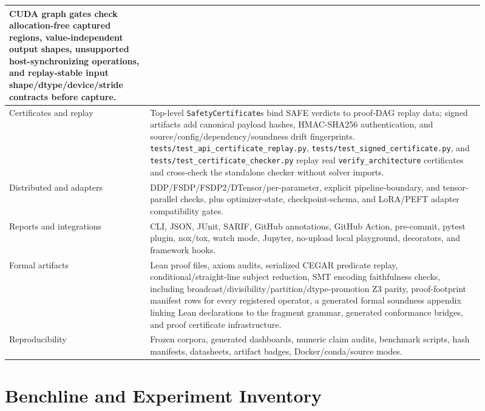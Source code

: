 \documentclass[11pt]{article}
\begin{document}
\begin{longtable}{|p{0.27\linewidth}|p{0.64\linewidth}|}
CUDA graph gates check allocation-free captured regions, value-independent
output shapes, unsupported host-synchronizing operations, and replay-stable
input shape/dtype/device/stride contracts before capture. \\
\hline
Certificates and replay &
Top-level \texttt{SafetyCertificate}s bind SAFE verdicts to proof-DAG replay
data; signed artifacts add canonical payload hashes, HMAC-SHA256 authentication,
and source/config/dependency/soundness drift fingerprints.
\texttt{tests/test\_api\_certificate\_replay.py},
\texttt{tests/test\_signed\_certificate.py}, and
\texttt{tests/test\_certificate\_checker.py} replay real
\texttt{verify\_architecture} certificates and cross-check the standalone
checker without solver imports. \\
\hline
Distributed and adapters &
DDP/FSDP/FSDP2/DTensor/per-parameter, explicit pipeline-boundary, and
tensor-parallel checks, plus
optimizer-state, checkpoint-schema, and LoRA/PEFT adapter compatibility gates. \\
\hline
Reports and integrations &
CLI, JSON, JUnit, SARIF, GitHub annotations, GitHub Action, pre-commit, pytest
plugin, nox/tox, watch mode, Jupyter, no-upload local playground, decorators,
and framework hooks. \\
\hline
Formal artifacts &
Lean proof files, axiom audits, serialized CEGAR predicate replay,
conditional/straight-line subject reduction, SMT encoding faithfulness checks,
including broadcast/divisibility/partition/dtype-promotion Z3 parity,
proof-footprint manifest rows for every registered operator, a generated formal
soundness appendix linking Lean declarations to the fragment grammar, generated
conformance bridges, and proof certificate infrastructure. \\
\hline
Reproducibility &
Frozen corpora, generated dashboards, numeric claim audits, benchmark scripts,
hash manifests, datasheets, artifact badges, Docker/conda/source modes. \\
\hline
\end{longtable}

\section{Benchline and Experiment Inventory}
\end{document}
